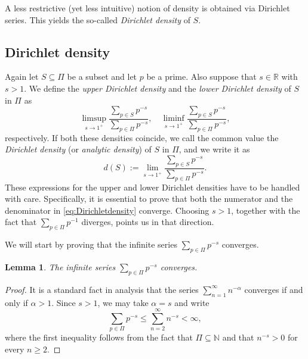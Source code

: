 \documentclass[a4paper,11pt]{article}
\theoremstyle{plain}
\newtheorem{lemma}[lemma]{Lemma}
\newcommand{\N}{\ensuremath{\mathbb{N}}} %
\newcommand{\R}{\ensuremath{\mathbb{R}}} %
\begin{document}
    A less restrictive (yet less intuitive) notion of density is obtained via Dirichlet series. This yields the so-called \emph{Dirichlet density} of $S$.

    \subsection{Dirichlet density}
    
    Again let $S\subseteq\Pi$ be a subset and let $p$ be a prime. Also suppose that $s\in\R$ with $s>1$. We define the \emph{upper Dirichlet density} and the \emph{lower Dirichlet density} of $S$ in $\Pi$ as
	\begin{equation*}
		\limsup_{s\rightarrow 1^+}\frac{\sum_{p\in S}p^{-s}}{\sum_{p\in \Pi}p^{-s}}, \quad \liminf_{s\rightarrow 1^+}\frac{\sum_{p\in S}p^{-s}}{\sum_{p\in \Pi}p^{-s}},
	\end{equation*}
	respectively. If both these densities coincide, we call the common value the \emph{Dirichlet density} (or \emph{analytic density}) of $S$ in $\Pi$, and we write it as
	\begin{equation}\label{eq:Dirichletdensity}
		d(S):=\lim_{s\rightarrow1^+}\frac{\sum_{p\in S}p^{-s}}{\sum_{p\in \Pi}p^{-s}}.
	\end{equation}        
    These expressions for the upper and lower Dirichlet densities have to be handled with care. Specifically, it is essential to prove that both the numerator and the denominator in \eqref{eq:Dirichletdensity} converge. Choosing $s>1$, together with the fact that $\sum_{p\in\Pi}p^{-1}$ diverges, points us in that direction.

    We will start by proving that the infinite series $\sum_{p\in\Pi}p^{-s}$ converges.
    \begin{lemma}
    \label{lemma:Dir1}
       The infinite series $\sum_{p\in\Pi}p^{-s}$ converges.
    \end{lemma}
    \begin{proof}
       It is a standard fact in analysis that the series $\sum_{n=1}^\infty n^{-\alpha}$ converges if and only if $\alpha>1$. Since $s>1$, we may take $\alpha=s$ and write
       \begin{equation*}
           \sum_{p\in\Pi}p^{-s}\leq \sum_{n=2}^\infty n^{-s}<\infty,
       \end{equation*}
       where the first inequality follows from the fact that $\Pi\subseteq\N$ and that $n^{-s}>0$ for every $n\geq 2$.
    \end{proof}
\end{document}
